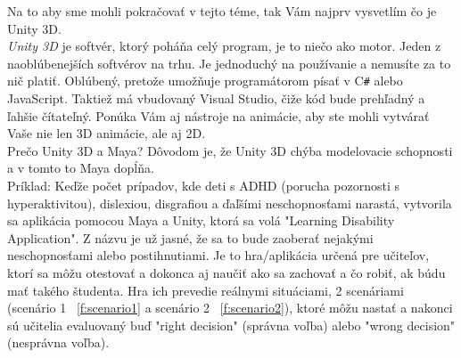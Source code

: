 \documentclass[10pt,oneside,slovak,a4paper]{article}
\begin{document}
Na to aby sme mohli pokračovať v tejto téme, tak Vám najprv vysvetlím čo je Unity 3D.\\

\emph{Unity 3D} je softvér, ktorý poháňa celý program, je to niečo ako motor. Jeden z naoblúbenejších softvérov na trhu. Je jednoduchý na používanie a nemusíte za to nič platiť. Oblúbený, pretože umožňuje programátorom písať v C\texttt{\#} alebo JavaScript. Taktiež má vbudovaný Visual Studio, čiže kód bude prehľadný a ľahšie čítateľný. Ponúka Vám aj nástroje na animácie, aby ste mohli vytvárať Vaše nie len 3D animácie, ale aj 2D.\\

Prečo Unity 3D a Maya? Dôvodom je, že Unity 3D chýba modelovacie schopnosti a v tomto to Maya dopĺňa.\cite{labschutz2011content}\\

Príklad:
Keďže počet prípadov, kde deti s ADHD (porucha pozornosti s hyperaktivitou), dislexiou, disgrafiou a ďaľšími neschopnosťami narastá, vytvorila sa aplikácia pomocou Maya a Unity, ktorá sa volá "Learning Disability Application". Z názvu je už jasné, že sa to bude zaoberať nejakými neschopnosťami alebo postihnutiami. Je to hra/aplikácia určená pre učiteľov, ktorí sa môžu otestovať a dokonca aj naučiť ako sa zachovať a čo robiť, ak búdu mať takého študenta. Hra ich prevedie reálnymi situáciami, 2 scenáriami (scenário 1 ~\ref{f:scenario1} a scenário 2 ~\ref{f:scenario2}), ktoré môžu nastať a nakonci sú učitelia evaluovaný buď "right decision" (správna voľba) alebo "wrong decision" (nesprávna voľba)\cite{studies}.
\end{document}
